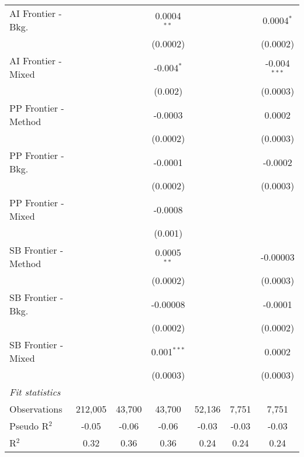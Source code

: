 \begin{tabular}{lcccccc}
   AI Frontier - Bkg.   &               &               & 0.0004$^{**}$  &                &                & 0.0004$^{*}$\\   
                        &               &               & (0.0002)       &                &                & (0.0002)\\   
   AI Frontier - Mixed  &               &               & -0.004$^{*}$   &                &                & -0.004$^{***}$\\   
                        &               &               & (0.002)        &                &                & (0.0003)\\   
   PP Frontier - Method &               &               & -0.0003        &                &                & 0.0002\\   
                        &               &               & (0.0002)       &                &                & (0.0003)\\   
   PP Frontier - Bkg.   &               &               & -0.0001        &                &                & -0.0002\\   
                        &               &               & (0.0002)       &                &                & (0.0003)\\   
   PP Frontier - Mixed  &               &               & -0.0008        &                &                &   \\   
                        &               &               & (0.001)        &                &                &   \\   
   SB Frontier - Method &               &               & 0.0005$^{**}$  &                &                & -0.00003\\   
                        &               &               & (0.0002)       &                &                & (0.0003)\\   
   SB Frontier - Bkg.   &               &               & -0.00008       &                &                & -0.0001\\   
                        &               &               & (0.0002)       &                &                & (0.0002)\\   
   SB Frontier - Mixed  &               &               & 0.001$^{***}$  &                &                & 0.0002\\   
                        &               &               & (0.0003)       &                &                & (0.0003)\\   
   \midrule
   \emph{Fit statistics}\\
   Observations         & 212,005       & 43,700        & 43,700         & 52,136         & 7,751          & 7,751\\  
   Pseudo R$^2$         & -0.05         & -0.06         & -0.06          & -0.03          & -0.03          & -0.03\\  
   R$^2$                & 0.32          & 0.36          & 0.36           & 0.24           & 0.24           & 0.24\\  
   

\end{tabular}
